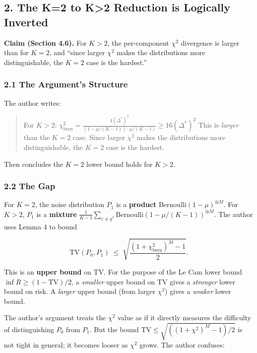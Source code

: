 \documentclass[
  12pt,
]{article}
\begin{document}
\subsection{2. The K=2 to K\textgreater2 Reduction is Logically
Inverted}\label{the-k2-to-k2-reduction-is-logically-inverted}

\textbf{Claim (Section 4.6).} For \(K>2\), the per-component \(\chi^2\)
divergence is larger than for \(K=2\), and ``since larger \(\chi^2\)
makes the distributions more distinguishable, the \(K=2\) case is the
hardest.''

\subsubsection{2.1 The Argument's
Structure}\label{the-arguments-structure}

The author writes:

\begin{quote}
For \(K>2\):
\(\chi^2_{\text{bern}} = \frac{4(\Delta^*)^2}{(1-\mu/(K-1))\cdot \mu/(K-1)} \geq 16(\Delta^*)^2\)
This is \emph{larger} than the \(K=2\) case. Since larger \(\chi^2\)
makes the distributions more distinguishable, the \(K=2\) case is the
hardest.
\end{quote}

Then concludes the \(K=2\) lower bound holds for \(K>2\).

\subsubsection{2.2 The Gap}\label{the-gap}

For \(K=2\), the noise distribution \(P_1\) is a \textbf{product}
\(\text{Bernoulli}(1-\mu)^{\otimes M}\). For \(K>2\), \(P_1\) is a
\textbf{mixture}
\(\frac{1}{K-1}\sum_{c\neq y^*} \text{Bernoulli}(1-\mu/(K-1))^{\otimes M}\).
The author uses Lemma 4 to bound

\[\text{TV}(P_0, P_1) \;\leq\; \sqrt{\frac{(1+\chi^2_{\text{bern}})^M - 1}{2}}.\]

This is an \textbf{upper bound} on TV. For the purpose of the Le Cam
lower bound \(\inf R \geq (1 - \text{TV})/2\), a \emph{smaller} upper
bound on TV gives a \emph{stronger} lower bound on risk. A \emph{larger}
upper bound (from larger \(\chi^2\)) gives a \emph{weaker} lower bound.

The author's argument treats the \(\chi^2\) value as if it directly
measures the difficulty of distinguishing \(P_0\) from \(P_1\). But the
bound \(\text{TV} \leq \sqrt{((1+\chi^2)^M - 1)/2}\) is not tight in
general; it becomes looser as \(\chi^2\) grows. The author confuses:
\end{document}
